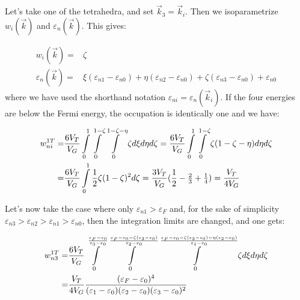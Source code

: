 \documentclass[10pt]{article}
\begin{document}
Let's take one of the tetrahedra, and set $\vec{k}_3=\vec{k}_i$. Then we isoparametrize $w_i(\vec{k})$
and $\varepsilon_{n}(\vec{k})$. This gives:

\begin{subequations}\label{isowep}
\begin{align}
w_i(\vec{k})=&\zeta \\
\varepsilon_{n}(\vec{k})=&\xi(\varepsilon_{n1}-\varepsilon_{n0})+%
\eta(\varepsilon_{n2}-\varepsilon_{n0})+%
\zeta(\varepsilon_{n3}-\varepsilon_{n0})+\varepsilon_{n0}
\end{align}
\end{subequations}
where we have used the shorthand notation $\varepsilon_{ni}=\varepsilon_{n}(\vec{k}_i)$.  If the four
energies are below the Fermi energy, the occupation is identically one and we have:

\begin{equation}\label{4oc}
\begin{align}
w_{ni}^{1T}=&\frac{6V_T}{V_G}\int\limits_0^1{\int\limits_0^{1-\zeta}{%
\int\limits_0^{1-\zeta-\eta}{\zeta d\xi} d\eta}
d\zeta}=\frac{6V_T}{V_G}\int\limits_0^1{\int\limits_0^{1-\zeta}{\zeta(1-\zeta-\eta) d\eta}d\zeta}\\
=&\frac{6V_T}{V_G}\int\limits_0^1{\frac{1}{2}\zeta(1-\zeta)^2d\zeta}=
\frac{3V_T}{V_G}(\frac{1}{2}-\tfrac{2}{3}+\tfrac{1}{4})=\frac{V_T}{4V_G}
\end{align}
\end{equation}

Let's now take the case where only $\varepsilon_{n1}>\varepsilon_{F}$ and, for the sake of simplicity
$\varepsilon_{n3}>\varepsilon_{n2}>\varepsilon_{n1}>\varepsilon_{n0}$, then the integration limits are
changed, and one gets:

\begin{equation}\label{1oc}
\begin{align}
w_{n3}^{1T}=&\frac{6V_T}{V_G}\int\limits_0^{\frac{\varepsilon_F-\varepsilon_0}{\varepsilon_3-\varepsilon_0}}%
{\int\limits_0^{\frac{\varepsilon_F-\varepsilon_0-\zeta(\varepsilon_3-\varepsilon_0)}{\varepsilon_2-\varepsilon_0}}{%
\int\limits_0^{\frac{\varepsilon_F-\varepsilon_0-\zeta(\varepsilon_3-\varepsilon_0)-\eta(\varepsilon_2-\varepsilon_0)}%
{\varepsilon_1-\varepsilon_0}}{\zeta d\xi} d\eta}
d\zeta}\\
=&\frac{V_T}{4V_G}\frac{(\varepsilon_F-\varepsilon_0)^4}
{(\varepsilon_1-\varepsilon_0)(\varepsilon_2-\varepsilon_0)(\varepsilon_3-\varepsilon_0)^2}
\end{align}
\end{equation}
\end{document}
